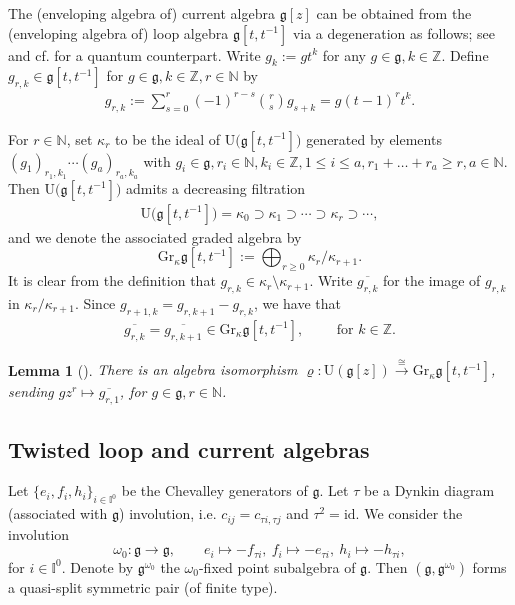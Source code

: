 \documentclass[11pt,reqno]{amsart}
\numberwithin{equation}{section}
\newtheorem{lem}[thm]{Lemma}
\theoremstyle{definition}
\theoremstyle{remark}
\newcommand{\bN}{\mathbb{N}}
\newcommand{\g}{\mathfrak{g}}
\newcommand{\gge}{\geqslant}
\newcommand{\lle}{\leqslant}
\newcommand{\rU}{{\mathrm{U}}}
\def \Gr{\mathrm{Gr}}
\def \I{\mathbb{I}}
\def \Z{\mathbb{Z}}
\def \ov{\overline}
\begin{document}
The (enveloping algebra of) current algebra $\g[z]$ can be obtained from the (enveloping algebra of) loop algebra $\g[t,t^{-1}]$ via a degeneration as follows; see \cite{KLWZ23a} and cf. \cite{GM12} for a quantum counterpart. Write $g_k:=gt^k$ for any $g\in \g,k\in \Z$. Define $g_{r,k}\in \g[t,t^{-1}]$ for $g\in \g, k\in \Z, r\in\bN$ by
\begin{align}\label{xrk}
g_{r,k}:=\sum_{s=0}^r (-1)^{r-s} \binom{r}{s} g_{s+k}=g(t-1)^r t^k.
\end{align}

For $r\in\bN$, set $\kappa_r$ to be the ideal of $ \rU\big(\g[t,t^{-1}]\big)$ generated by elements $(g_1)_{r_1,k_1} \cdots (g_a)_{r_a,k_a}$ with $g_i\in \g,r_i\in\bN, k_i\in \Z, 1\lle i\lle a, r_1+\ldots + r_a \gge r, a\in\bN$. Then $\rU\big(\g[t,t^{-1}]\big)$ admits a decreasing filtration 
\begin{align}  \label{filtration}
\rU\big(\g[t,t^{-1}]\big) =\kappa_0 \supset \kappa_1 \supset \cdots \supset \kappa_r \supset \cdots, 
\end{align}
and we denote the associated graded algebra by 
\[
\Gr_{\kappa}\g[t,t^{-1}]:=\bigoplus_{r\gge 0} \kappa_r/ \kappa_{r+1}. 
\]
It is clear from the definition that
$g_{r,k}\in \kappa_r\setminus \kappa_{r+1}.$
Write $\ov{g_{r,k}}$ for the image of $g_{r,k}$ in  $\kappa_r / \kappa_{r+1}$. Since $g_{r+1,k}=g_{r,k+1}-g_{r,k}$, we have that 
\begin{align}\label{climit}
\ov{g_{r,k}}=\overline{g_{r,k+1}} \in  \Gr_{\kappa}\g[t,t^{-1}],\qquad  \text{ for }k\in \Z.
\end{align}

\begin{lem}[{\cite[Prop. 2.1]{KLWZ23b}}]\label{prop:iso}
There is an algebra isomorphism $\varrho: \rU(\g[z]) \stackrel{\cong}{\longrightarrow} \Gr_{\kappa}\g[t,t^{-1}]$, sending $g z^r\mapsto \ov{g_{r,1}}$, for $g\in \g,r\in\bN$. 
\end{lem}

\subsection{Twisted loop and current algebras}\label{sec:twloop}
Let $\{e_i,f_i,h_i\}_{i\in\I^0}$ be the Chevalley generators of $\g$. Let $\tau$ be a Dynkin diagram (associated with $\g$) involution, i.e. $c_{ij}=c_{\tau i,\tau j}$ and $\tau^2=\mathrm{id}$. We consider the involution 
\[
\omega_0:\g \to \g,\qquad  e_{i}\mapsto -f_{\tau i},~ f_i\mapsto -e_{\tau i},~h_i\mapsto -h_{\tau i},
\]
for $i\in \I^0$. Denote by $\g^{\omega_0}$ the $\omega_0$-fixed point subalgebra of $\g$. Then $(\g,\g^{\omega_0})$ forms a quasi-split symmetric pair (of finite type).
\end{document}
